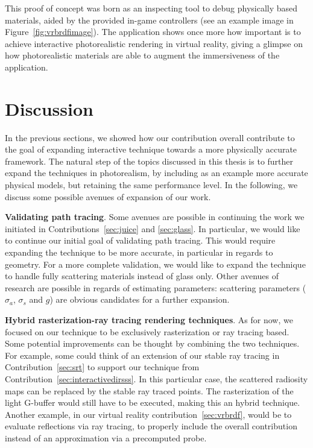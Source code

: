 This proof of concept was born as an inspecting tool to debug physically based materials, aided by the provided in-game controllers (see an example image in Figure~\ref{fig:vrbrdfimage}). The application shows once more how important is to achieve interactive photorealistic rendering in virtual reality, giving a glimpse on how photorealistic materials are able to augment the immersiveness of the application. 

\section{Discussion}
In the previous sections, we showed how our contribution overall contribute to the goal of expanding interactive technique towards a more physically accurate framework. The natural step of the topics discussed in this thesis is to further expand the techniques in photorealism, by including as an example more accurate physical models, but retaining the same performance level. In the following, we discuss some possible avenues of expansion of our work.

\textbf{Validating path tracing}. Some avenues are possible in continuing the work we initiated in Contributions~\ref{sec:juice} and \ref{sec:glass}. In particular, we would like to continue our initial goal of validating path tracing. This would require expanding the technique to be more accurate, in particular in regards to geometry. For a more complete validation, we would like to expand the technique to handle fully scattering materials instead of glass only. Other avenues of research are possible in regards of estimating parameters: scattering parameters ($\sigma_a$, $\sigma_s$ and $g$) are obvious candidates for a further expansion.

\textbf{Hybrid rasterization-ray tracing rendering techniques}. As for now, we focused on our technique to be exclusively rasterization or ray tracing based. Some potential improvements can be thought by combining the two techniques. For example, some could think of an extension of our stable ray tracing in Contribution~\ref{sec:srt} to support our technique from Contribution~\ref{sec:interactivedirsss}. In this particular case, the scattered radiosity maps can be replaced by the stable ray traced points. The rasterization of the light G-buffer would still have to be executed, making this an hybrid technique.  Another example, in our virtual reality contribution~\ref{sec:vrbrdf}, would be to evaluate reflections via ray tracing, to properly include the overall contribution instead of an approximation via a precomputed probe.


